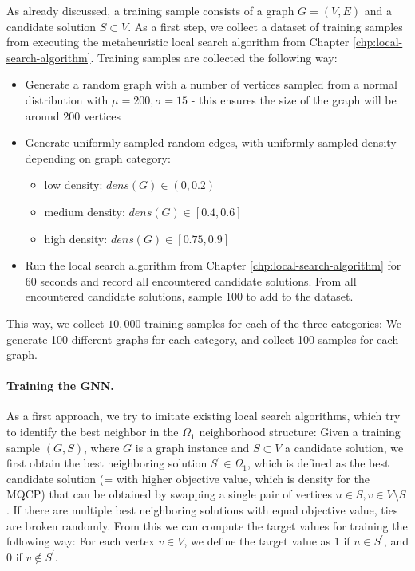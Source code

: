 \documentclass[draft,final]{vutinfth} %
\begin{document}
As already discussed, a training sample consists of a graph $G = (V, E)$ and a candidate solution $S \subset V$. 
As a first step, we collect a dataset of training samples from executing the metaheuristic local search algorithm from Chapter \ref{chp:local-search-algorithm}. Training samples are collected the following way: 
\begin{itemize}
    \item Generate a random graph with a number of vertices sampled from a normal distribution with $\mu = 200, \sigma = 15$ - this ensures the size of the graph will be around 200 vertices
    \item Generate uniformly sampled random edges, with uniformly sampled density depending on graph category: 
    \begin{itemize}
        \item low density: $dens(G) \in (0, 0.2)$
        \item medium density: $dens(G) \in [0.4, 0.6]$
        \item high density: $dens(G) \in [0.75, 0.9]$
    \end{itemize}
    \item Run the local search algorithm from Chapter \ref{chp:local-search-algorithm} for 60 seconds and record all encountered candidate solutions. From all encountered candidate solutions, sample 100 to add to the dataset. 
\end{itemize}
This way, we collect $10,000$ training samples for each of the three categories: We generate 100 different graphs for each category, and collect 100 samples for each graph. 

\paragraph{Training the GNN.} As a first approach, we try to imitate existing local search algorithms, which try to identify the best neighbor in the $\Omega_1$ neighborhood structure: Given a training sample $(G, S)$, where $G$ is a graph instance and $S \subset V$ a candidate solution, we first obtain the best neighboring solution $S^\prime \in \Omega_1$, which is defined as the best candidate solution (= with higher objective value, which is density for the MQCP) that can be obtained by swapping a single pair of vertices $u \in S, v \in V \setminus S$. If there are multiple best neighboring solutions with equal objective value, ties are broken randomly. From this we can compute the target values for training the following way: For each vertex $v \in V$, we define the target value as $1$ if $u \in S^\prime$, and $0$ if $v \notin S^\prime$. 
\end{document}
